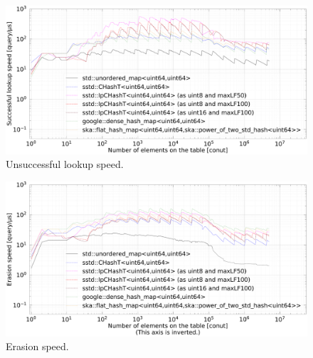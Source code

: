 \begin{figure}[h]
  \hspace{-3mm}
  \includegraphics[scale=0.24]{./fig_bench/find_unsuccessful_lookup_med.pdf}
  \caption{ Unsuccessful lookup speed. }
  \label{fig_bench_insert}
\end{figure}

\begin{figure}[h]
  \hspace{-3mm}
  \includegraphics[scale=0.24]{./fig_bench/erase_med.pdf}
  \caption{ Erasion speed. }
  \label{fig_bench_insert}
\end{figure}
















